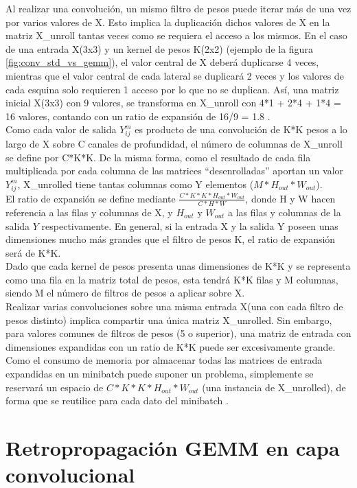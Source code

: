 Al realizar una convolución, un mismo filtro de pesos puede iterar más de una vez por varios valores de X. Esto implica la duplicación dichos valores de X en la matriz X\_unroll tantas veces como se requiera el acceso a los mismos. En el caso de una entrada X(3x3) y un kernel de pesos K(2x2) (ejemplo de la figura \ref{fig:conv_std_vs_gemm}), el valor central de X deberá duplicarse 4 veces, mientras que el valor central de cada lateral se duplicará 2 veces y los valores de cada esquina solo requieren 1 acceso por lo que no  se duplican. Así, una matriz inicial X(3x3) con 9 valores, se transforma en X\_unroll con 4*1 + 2*4 + 1*4 = 16 valores, contando con un ratio de expansión de 16/9 = 1.8 . \\
 Como cada valor de salida $Y^m_{ij}$ es producto de una convolución de K*K pesos a lo largo de X sobre C canales de profundidad, el número de columnas de X\_unroll se define por C*K*K. De la misma forma, como el resultado de cada fila multiplicada por cada columna de las matrices ``desenrolladas'' aportan un valor $Y^m_{ij}$, X\_unrolled tiene tantas columnas como Y elementos ($M*H_{out}*W_{out}$). \\
 El ratio de expansión se define mediante $\frac{C*K*K*H_{out}*W_{out}}{C*H*W}$, donde H y W hacen referencia a las filas y columnas de X, y $H_{out}$ y $W_{out}$ a las filas y columnas de la salida $Y$ respectivamente. En general, si la entrada X y la salida Y poseen unas dimensiones mucho más grandes que el filtro de pesos K, el ratio de expansión será de K*K. \\
 Dado que cada kernel de pesos presenta unas dimensiones de K*K y se representa como una fila en la matriz total de pesos, esta tendrá K*K filas y M columnas, siendo M el número de filtros de pesos a aplicar sobre X. \\
 Realizar varias convoluciones sobre una misma entrada X(una con cada filtro de pesos distinto) implica compartir una única matriz X\_unrolled. Sin embargo, para valores comunes de filtros de pesos (5 o superior), una matriz de entrada con dimensiones expandidas con un ratio de K*K puede ser excesivamente grande. Como el consumo de memoria por almacenar todas las matrices de entrada expandidas en un minibatch puede suponer un problema, simplemente se reservará un espacio de $C*K*K*H_{out}*W_{out}$ (una instancia de X\_unrolled), de forma que se reutilice para cada dato del minibatch \cite{Programming_Massively}.

\newpage

\section{Retropropagación GEMM en capa convolucional}

